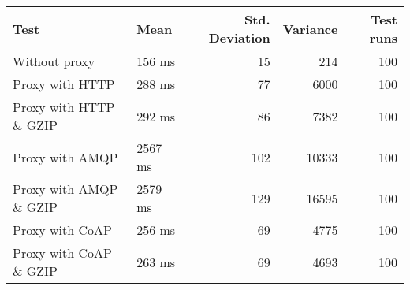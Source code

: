 \begin{tabular}{llrrr}
\hline
 Test                   & Mean    &   Std. Deviation &   Variance &   Test runs \\
\hline
 Without proxy          & 156 ms  &               15 &        214 &         100 \\
 Proxy with HTTP        & 288 ms  &               77 &       6000 &         100 \\
 Proxy with HTTP \& GZIP & 292 ms  &               86 &       7382 &         100 \\
 Proxy with AMQP        & 2567 ms &              102 &      10333 &         100 \\
 Proxy with AMQP \& GZIP & 2579 ms &              129 &      16595 &         100 \\
 Proxy with CoAP        & 256 ms  &               69 &       4775 &         100 \\
 Proxy with CoAP \& GZIP & 263 ms  &               69 &       4693 &         100 \\
\hline
\end{tabular}